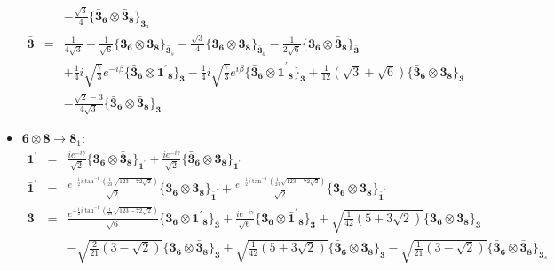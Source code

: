\documentclass[english]{article}
\newcommand{\subcg}[3]{\big\{ {#1}\otimes{#2}\big\}^{}_{#3}}
\newcommand{\rep}[1]{\mathbf{#1}}
\begin{document}
\begin{itemize}
\begin{eqnarray*}
 & & -\frac{\sqrt{3}}{4}\subcg{\rep{\bar{3}}_{\rep{6}}}{\rep{\bar{3}}_{\rep{8}}}{\rep{3}_{a}}
\\
\rep{\bar{3}} &=& \frac{1}{4 \sqrt{3}}+\frac{1}{\sqrt{6}}\subcg{\rep{3}_{\rep{6}}}{\rep{3}_{\rep{8}}}{\rep{\bar{3}}_{s}}-\frac{\sqrt{3}}{4}\subcg{\rep{3}_{\rep{6}}}{\rep{3}_{\rep{8}}}{\rep{\bar{3}}_{a}}-\frac{1}{2 \sqrt{6}}\subcg{\rep{3}_{\rep{6}}}{\rep{\bar{3}}_{\rep{8}}}{\rep{\bar{3}}} \\ 
 & & +\frac{1}{4} i \sqrt{\frac{7}{3}} e^{-i \beta }\subcg{\rep{\bar{3}}_{\rep{6}}}{\rep{1^{\prime}}_{\rep{8}}}{\rep{\bar{3}}}-\frac{1}{4} i \sqrt{\frac{7}{3}} e^{i \beta }\subcg{\rep{\bar{3}}_{\rep{6}}}{\rep{\bar{1}^{\prime}}_{\rep{8}}}{\rep{\bar{3}}}+\frac{1}{12} \left(\sqrt{3}+\sqrt{6}\right)\subcg{\rep{\bar{3}}_{\rep{6}}}{\rep{3}_{\rep{8}}}{\rep{\bar{3}}} \\ 
 & & -\frac{\sqrt{2}-3}{4 \sqrt{3}}\subcg{\rep{\bar{3}}_{\rep{6}}}{\rep{\bar{3}}_{\rep{8}}}{\rep{\bar{3}}}
\end{eqnarray*}
\item $\rep{6}\otimes\rep{8}\to\rep{8}_{1}$:
\begin{eqnarray*}
\rep{1^{\prime}} &=& \frac{i e^{-i \gamma }}{\sqrt{2}}\subcg{\rep{3}_{\rep{6}}}{\rep{\bar{3}}_{\rep{8}}}{\rep{1^{\prime}}}+\frac{i e^{-i \gamma }}{\sqrt{2}}\subcg{\rep{\bar{3}}_{\rep{6}}}{\rep{3}_{\rep{8}}}{\rep{1^{\prime}}}
\\
\rep{\bar{1}^{\prime}} &=& \frac{e^{-\frac{1}{2} i \tan ^{-1}\left(\frac{1}{23} \sqrt{123-72 \sqrt{2}}\right)}}{\sqrt{2}}\subcg{\rep{3}_{\rep{6}}}{\rep{\bar{3}}_{\rep{8}}}{\rep{\bar{1}^{\prime}}}+\frac{e^{-\frac{1}{2} i \tan ^{-1}\left(\frac{1}{23} \sqrt{123-72 \sqrt{2}}\right)}}{\sqrt{2}}\subcg{\rep{\bar{3}}_{\rep{6}}}{\rep{3}_{\rep{8}}}{\rep{\bar{1}^{\prime}}}
\\
\rep{3} &=& \frac{e^{-\frac{1}{2} i \tan ^{-1}\left(\frac{1}{23} \sqrt{123-72 \sqrt{2}}\right)}}{\sqrt{6}}\subcg{\rep{3}_{\rep{6}}}{\rep{1^{\prime}}_{\rep{8}}}{\rep{3}}+\frac{i e^{-i \gamma }}{\sqrt{6}}\subcg{\rep{3}_{\rep{6}}}{\rep{\bar{1}^{\prime}}_{\rep{8}}}{\rep{3}}+\sqrt{\frac{1}{42} \left(5+3 \sqrt{2}\right)}\subcg{\rep{3}_{\rep{6}}}{\rep{3}_{\rep{8}}}{\rep{3}} \\ 
 & & -\sqrt{\frac{2}{21} \left(3-\sqrt{2}\right)}\subcg{\rep{3}_{\rep{6}}}{\rep{\bar{3}}_{\rep{8}}}{\rep{3}}+\sqrt{\frac{1}{42} \left(5+3 \sqrt{2}\right)}\subcg{\rep{\bar{3}}_{\rep{6}}}{\rep{3}_{\rep{8}}}{\rep{3}}-\sqrt{\frac{1}{21} \left(3-\sqrt{2}\right)}\subcg{\rep{\bar{3}}_{\rep{6}}}{\rep{\bar{3}}_{\rep{8}}}{\rep{3}_{s}}
\\

\end{eqnarray*}
\end{itemize}
\end{document}
